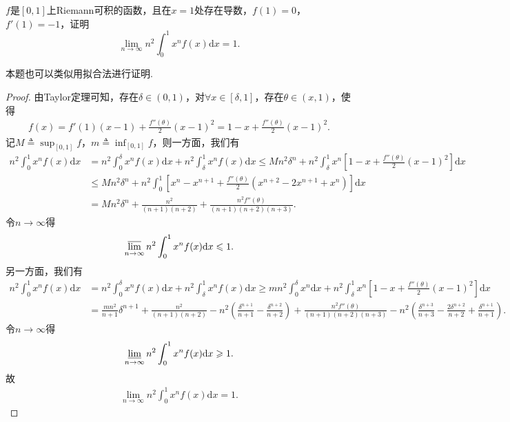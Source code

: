 \documentclass[../../main.tex]{subfiles}%
\begin{document}
\begin{example}
$f$是$[0,1]$上Riemann可积的函数，且在$x=1$处存在导数，$f(1)=0$，$f'(1)=-1$，证明$$\lim\limits_{n \to \infty} n^2 \int_0^1 x^n f(x) \mathrm{d}x = 1.$$
\end{example}
\begin{note}
本题也可以类似用拟合法进行证明.
\end{note}
\begin{proof}
由Taylor定理可知，存在$\delta \in (0,1)$，对$\forall x\in [\delta,1]$，存在$\theta \in (x,1)$，使得
\begin{align*}
f(x) = f'(1)(x-1) + \frac{f''(\theta)}{2}(x-1)^2 = 1 - x + \frac{f''(\theta)}{2}(x-1)^2.
\end{align*}
记$M \triangleq \sup_{[0,1]}f$，$m \triangleq \inf_{[0,1]}f$，则一方面，我们有
\begin{align*}
n^2\int_0^1 x^n f(x) \mathrm{d}x &= n^2\int_0^\delta x^n f(x) \mathrm{d}x + n^2\int_\delta^1 x^n f(x) \mathrm{d}x \leqslant Mn^2\delta^n + n^2\int_\delta^1 x^n \left[1 - x + \frac{f''(\theta)}{2}(x - 1)^2\right] \mathrm{d}x \\
&\leqslant Mn^2\delta^n + n^2\int_0^1 \left[x^n - x^{n+1} + \frac{f''(\theta)}{2}(x^{n+2} - 2x^{n+1} + x^n)\right] \mathrm{d}x \\
&= Mn^2\delta^n + \frac{n^2}{(n+1)(n+2)} + \frac{n^2 f''(\theta)}{(n+1)(n+2)(n+3)}.
\end{align*}
令$n \to \infty$得
\begin{align*}
\varlimsup_{n \to \infty} n^2\int_0^1 x^n f(x) \mathrm{d}x \leqslant 1.
\end{align*}
另一方面，我们有
\begin{align*}
n^2\int_0^1 x^n f(x) \mathrm{d}x &= n^2\int_0^\delta x^n f(x) \mathrm{d}x + n^2\int_\delta^1 x^n f(x) \mathrm{d}x \geqslant mn^2\int_0^{\delta}{x^n\mathrm{d}x} + n^2\int_\delta^1 x^n \left[1 - x + \frac{f''(\theta)}{2}(x - 1)^2\right] \mathrm{d}x \\
&= \frac{mn^2}{n+1}\delta ^{n+1} + \frac{n^2}{(n+1)(n+2)} - n^2\left(\frac{\delta^{n+1}}{n+1} - \frac{\delta^{n+2}}{n+2}\right) + \frac{n^2 f''(\theta)}{(n+1)(n+2)(n+3)} - n^2\left(\frac{\delta^{n+3}}{n+3} - \frac{2\delta^{n+2}}{n+2} + \frac{\delta^{n+1}}{n+1}\right).
\end{align*}
令$n \to \infty$得
\begin{align*}
\varliminf_{n \to \infty} n^2\int_0^1 x^n f(x) \mathrm{d}x \geqslant 1.
\end{align*}
故
\begin{align*}
\lim_{n \to \infty} n^2\int_0^1 x^n f(x) \mathrm{d}x = 1.
\end{align*}
\end{proof}
\end{document}
